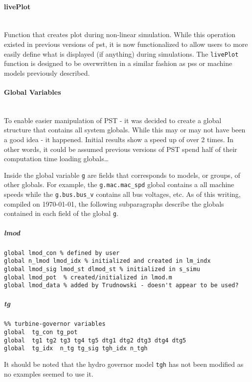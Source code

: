 \documentclass[12pt]{article}
\begin{document}
\paragraph{livePlot} \ \\
Function that creates plot during non-linear simulation.
While this operation existed in previous versions of pst, it is now functionalized to allow users to more easily define what is displayed (if anything) during simulations.
The \verb|livePlot| function is designed to be overwritten in a similar fashion as pss or machine models previously described.

\pagebreak
\paragraph{Global Variables} \ \\
To enable easier manipulation of PST - it was decided to create a global structure that contains all system globals.
While this may or may not have been a good idea - it happened.
Initial results show a speed up of over 2 times.
In other words, it could be assumed previous versions of PST spend half of their computation time loading globals\ldots


Inside the global variable \verb|g| are fields that corresponds to models, or groups, of other globals.
For example, the \verb|g.mac.mac_spd| global contains a all machine speeds while the \verb|g.bus.bus_v| contains all bus voltages, etc.
As of this writing, compiled on \today, the following subparagraphs describe the globals contained in each field of the global \verb|g|. 

\subparagraph{lmod}
\begin{verbatim}
global lmod_con % defined by user
global n_lmod lmod_idx % initialized and created in lm_indx
global lmod_sig lmod_st dlmod_st % initialized in s_simu
global lmod_pot  % created/initialized in lmod.m 
global lmod_data % added by Trudnowski - doesn't appear to be used?
\end{verbatim}

\subparagraph{tg}
\begin{verbatim}
%% turbine-governor variables
global  tg_con tg_pot
global  tg1 tg2 tg3 tg4 tg5 dtg1 dtg2 dtg3 dtg4 dtg5
global  tg_idx  n_tg tg_sig tgh_idx n_tgh
\end{verbatim}
It should be noted that the hydro governor model \verb|tgh| has not been modified as no examples seemed to use it.
\end{document}
